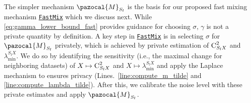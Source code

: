 \documentclass[11pt]{article}
\theoremstyle{definition}
\theoremstyle{plain}
\providecommand{\lemmaref}[1]{Lemma~\ref{#1}}
\newcommand{\pM}{\pazocal{M}}
\newcommand{\FastMix}{\hyperref[alg:fast_mixing]{\texttt{FastMix}}\xspace}
\begin{document}
The simpler mechanism \(\pM_{S_{\mathrm{f}}}\) is the basis for our proposed fast mixing mechanism \FastMix which we discuss next.
While \eqref{eq:gamma_lower_bound_fast} provides guidance for choosing \(\sigma\), \(\gamma\) is not a private quantity by definition.
A key step in \FastMix is in selecting \(\sigma\) for \(\pM_{S_{\mathrm{f}}}\) privately, which is achieved by private estimation of \(\textsc{C}_{S_{\mathrm{f}}X}^{2}\) and \(\lambda_{\min}^{S_{\mathrm{f}}X}\).
We do so by identifying the sensitivity (i.e., the maximal change for neighboring datasets) of \(X \mapsto \textsc{C}_{S_{\mathrm{f}}X}^{2}\) and \(X \mapsto \lambda_{\min}^{S_{\mathrm{f}}X}\) and apply the Laplace mechanism to ensures privacy (Lines.~\ref{line:compute_m_tilde} and \ref{line:compute_lambda_tilde}).
After this, we calibrate the noise level with these private estimates and apply \(\pM_{S_{\mathrm{f}}}\).
\end{document}
